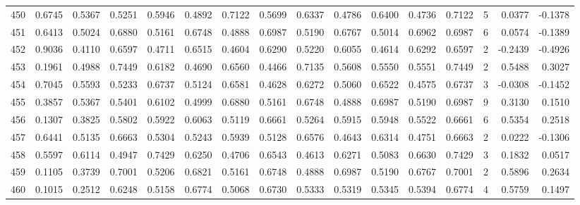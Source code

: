 \begin{tabular}{lrrrrrrrrrrrrrrr}
450 &      0.6745 &  0.5367 &  0.5251 &  0.5946 &  0.4892 &  0.7122 &  0.5699 &  0.6337 &  0.4786 &  0.6400 &   0.4736 &     0.7122 &      5 &                    0.0377 &                    -0.1378 \\
451 &      0.6413 &  0.5024 &  0.6880 &  0.5161 &  0.6748 &  0.4888 &  0.6987 &  0.5190 &  0.6767 &  0.5014 &   0.6962 &     0.6987 &      6 &                    0.0574 &                    -0.1389 \\
452 &      0.9036 &  0.4110 &  0.6597 &  0.4711 &  0.6515 &  0.4604 &  0.6290 &  0.5220 &  0.6055 &  0.4614 &   0.6292 &     0.6597 &      2 &                   -0.2439 &                    -0.4926 \\
453 &      0.1961 &  0.4988 &  0.7449 &  0.6182 &  0.4690 &  0.6560 &  0.4466 &  0.7135 &  0.5608 &  0.5550 &   0.5551 &     0.7449 &      2 &                    0.5488 &                     0.3027 \\
454 &      0.7045 &  0.5593 &  0.5233 &  0.6737 &  0.5124 &  0.6581 &  0.4628 &  0.6272 &  0.5060 &  0.6522 &   0.4575 &     0.6737 &      3 &                   -0.0308 &                    -0.1452 \\
455 &      0.3857 &  0.5367 &  0.5401 &  0.6102 &  0.4999 &  0.6880 &  0.5161 &  0.6748 &  0.4888 &  0.6987 &   0.5190 &     0.6987 &      9 &                    0.3130 &                     0.1510 \\
456 &      0.1307 &  0.3825 &  0.5802 &  0.5922 &  0.6063 &  0.5119 &  0.6661 &  0.5264 &  0.5915 &  0.5948 &   0.5522 &     0.6661 &      6 &                    0.5354 &                     0.2518 \\
457 &      0.6441 &  0.5135 &  0.6663 &  0.5304 &  0.5243 &  0.5939 &  0.5128 &  0.6576 &  0.4643 &  0.6314 &   0.4751 &     0.6663 &      2 &                    0.0222 &                    -0.1306 \\
458 &      0.5597 &  0.6114 &  0.4947 &  0.7429 &  0.6250 &  0.4706 &  0.6543 &  0.4613 &  0.6271 &  0.5083 &   0.6630 &     0.7429 &      3 &                    0.1832 &                     0.0517 \\
459 &      0.1105 &  0.3739 &  0.7001 &  0.5206 &  0.6821 &  0.5161 &  0.6748 &  0.4888 &  0.6987 &  0.5190 &   0.6767 &     0.7001 &      2 &                    0.5896 &                     0.2634 \\
460 &      0.1015 &  0.2512 &  0.6248 &  0.5158 &  0.6774 &  0.5068 &  0.6730 &  0.5333 &  0.5319 &  0.5345 &   0.5394 &     0.6774 &      4 &                    0.5759 &                     0.1497 \\

\end{tabular}
